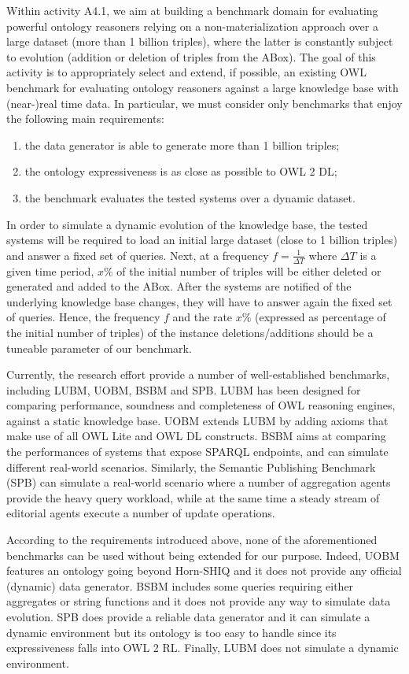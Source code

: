 \documentclass[oneside]{book}
\begin{document}
Within activity A4.1, we aim at building a benchmark domain for evaluating powerful ontology reasoners relying on a non-materialization approach over a large dataset (more than 1 billion triples), where the latter is constantly subject to evolution (addition or deletion of triples from the ABox). The goal of this activity is to appropriately select and extend, if possible, an existing OWL benchmark for evaluating ontology reasoners against a large knowledge base with (near-)real time data. In particular, we must consider only benchmarks that enjoy the following main requirements:
\begin{enumerate}
\item the data generator is able to generate more than 1 billion triples;
\item the ontology expressiveness is as close as possible to OWL 2 DL;
\item the benchmark evaluates the tested systems over a dynamic dataset. 
\end{enumerate}
In order to simulate a dynamic evolution of the knowledge base, the tested systems will be required to load an initial large dataset (close to 1 billion triples) and answer a fixed set of queries. Next, at a frequency $f=\frac{1}{\Delta T}$ where $\Delta T$ is a given time period,  $x\%$ of the initial number of triples will be either deleted or generated and added to the ABox. After the systems are notified of the underlying knowledge base changes, they will have to answer again the fixed set of queries. Hence, the frequency $f$ and the rate $x\%$ (expressed as percentage of the initial number of triples) of the instance deletions/additions should be a tuneable parameter of our benchmark. 

Currently, the research effort provide a number of well-established benchmarks, including LUBM, UOBM, BSBM and SPB. LUBM has been designed for comparing performance, soundness and completeness of OWL reasoning engines, against a static knowledge base. UOBM extends LUBM by adding axioms that make use of all OWL Lite and OWL DL constructs. BSBM aims at comparing the performances of systems that expose SPARQL endpoints, and can simulate different real-world scenarios. Similarly, the Semantic Publishing Benchmark (SPB) can simulate a real-world scenario where a number of aggregation agents provide the heavy query workload, while at the same time a steady stream of editorial agents execute a number of update operations.

According to the requirements introduced above, none of the aforementioned benchmarks can be used without being extended for our purpose. Indeed, UOBM features an ontology going beyond Horn-SHIQ and it does not provide any official (dynamic) data generator. BSBM includes some queries requiring either aggregates or string functions and it does not provide any way to simulate data evolution. SPB does provide a reliable data generator and it can simulate a dynamic environment but its ontology is too easy to handle since its expressiveness falls into OWL 2 RL. Finally, LUBM does not simulate a dynamic environment. 
\end{document}
